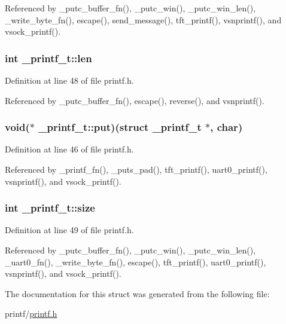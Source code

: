Referenced by \-\_\-putc\-\_\-buffer\-\_\-fn(), \-\_\-putc\-\_\-win(), \-\_\-putc\-\_\-win\-\_\-len(), \-\_\-write\-\_\-byte\-\_\-fn(), escape(), send\-\_\-message(), tft\-\_\-printf(), vsnprintf(), and vsock\-\_\-printf().

\hypertarget{struct__printf__t_a5139902cde74159b79e6418a34712bee}{
\subsubsection[{len}]{\setlength{\rightskip}{0pt plus 5cm}int \-\_\-printf\-\_\-t\-::len}}\label{struct__printf__t_a5139902cde74159b79e6418a34712bee}


Definition at line 48 of file printf.\-h.



Referenced by \-\_\-putc\-\_\-buffer\-\_\-fn(), escape(), reverse(), and vsnprintf().

\hypertarget{struct__printf__t_a3302c3396c6ff238e760c625ab51725b}{
\subsubsection[{put}]{\setlength{\rightskip}{0pt plus 5cm}void($\ast$ \-\_\-printf\-\_\-t\-::put)(struct {\bf \-\_\-printf\-\_\-t} $\ast$, char)}}\label{struct__printf__t_a3302c3396c6ff238e760c625ab51725b}


Definition at line 46 of file printf.\-h.



Referenced by \-\_\-printf\-\_\-fn(), \-\_\-puts\-\_\-pad(), tft\-\_\-printf(), uart0\-\_\-printf(), vsnprintf(), and vsock\-\_\-printf().

\hypertarget{struct__printf__t_a38c7a430cec9b063bf6df7a100d3abaa}{
\subsubsection[{size}]{\setlength{\rightskip}{0pt plus 5cm}int \-\_\-printf\-\_\-t\-::size}}\label{struct__printf__t_a38c7a430cec9b063bf6df7a100d3abaa}


Definition at line 49 of file printf.\-h.



Referenced by \-\_\-putc\-\_\-buffer\-\_\-fn(), \-\_\-putc\-\_\-win(), \-\_\-putc\-\_\-win\-\_\-len(), \-\_\-uart0\-\_\-fn(), \-\_\-write\-\_\-byte\-\_\-fn(), escape(), tft\-\_\-printf(), uart0\-\_\-printf(), vsnprintf(), and vsock\-\_\-printf().



The documentation for this struct was generated from the following file\-:\begin{DoxyCompactItemize}
\item 
printf/\hyperlink{printf_8h}{printf.\-h}\end{DoxyCompactItemize}
